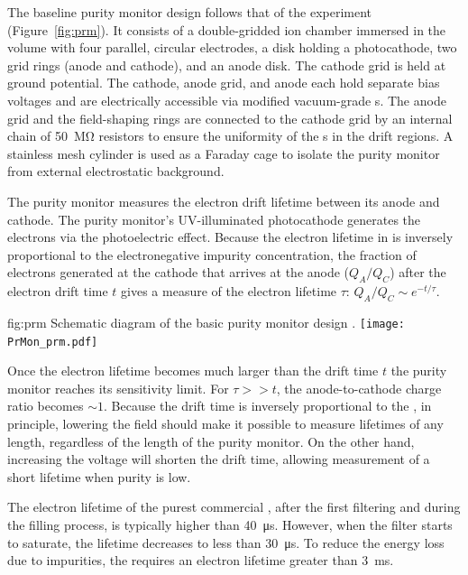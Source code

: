 The  baseline purity monitor design follows that of  the  experiment (Figure~\ref{fig:prm})\cite{Adamowski:2014daa}.  It consists of a double-gridded ion chamber immersed in the  volume with four parallel, circular electrodes, a disk holding a photocathode, two grid rings (anode and cathode), and an anode disk. The cathode grid is held at ground potential. The cathode, anode grid, and anode 
each hold separate bias voltages and are electrically accessible via modified vacuum-grade  \fdth{}s. %
The anode grid and the field-shaping rings are connected to the cathode grid by an internal chain of \SI{50}{\mega\ohm} resistors to ensure the uniformity of the \efield{}s in the drift regions. A stainless mesh cylinder is used as a Faraday cage to isolate the purity monitor from external electrostatic background. 

The purity monitor measures the electron drift lifetime between its anode and cathode. The purity monitor's UV-illuminated %
photocathode generates the electrons via the photoelectric effect. Because the electron lifetime in  is inversely proportional to the electronegative impurity concentration, the fraction of electrons generated at the cathode that arrives at the anode ($Q_A/Q_C$) after the electron drift time $t$ gives a measure of the electron lifetime $\tau$:
%
\( Q_A/Q_C \sim e^{-t/\tau}.\)



\begin{dunefigure}{fig:prm}
  {Schematic diagram of the basic purity monitor design \cite{Adamowski:2014daa}.}
  \texttt{[image: PrMon\_prm.pdf]}
\end{dunefigure}


Once the electron lifetime becomes much larger than the drift time $t$ the purity monitor reaches its sensitivity limit.  For $\tau >> t$, the anode-to-cathode charge ratio becomes 
$\sim\!1$. Because the drift time is inversely proportional to the \efield, in principle, lowering the %
field should make it possible to measure lifetimes of any length, regardless of the length of the purity monitor.
On the other hand, increasing the voltage will shorten the drift time, allowing measurement of a short lifetime when purity is low. 

The electron lifetime of the purest commercial , after the first filtering and during the filling process, is typically higher than \SI{40}{\micro\second}. However, when the filter starts to saturate, the lifetime decreases to less than \SI{30}{\micro\second}.  To %
reduce the energy loss due to impurities,  the  requires an electron lifetime greater than \SI{3}{\milli\second}.

